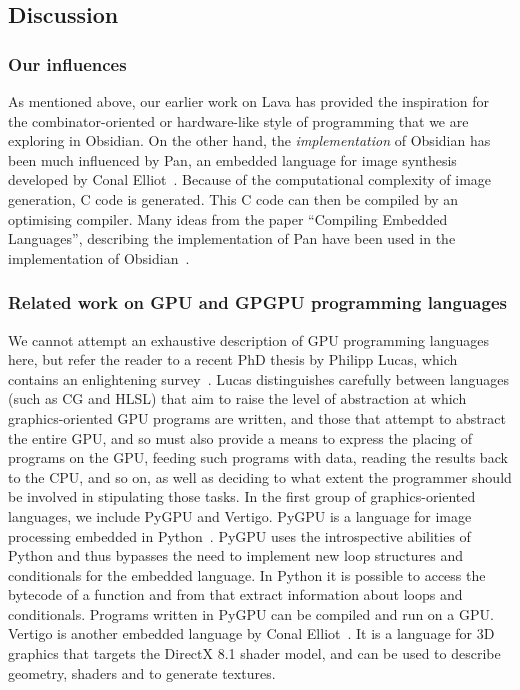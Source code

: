 
\subsection{Discussion} \label{sec:disc}
\subsubsection{Our influences}
As mentioned above, our earlier work on Lava has provided the inspiration for
the combinator-oriented or hardware-like style of programming that we are exploring in Obsidian.
On the other hand, the {\em implementation} of Obsidian has been much influenced by
{Pan}, an embedded language for image synthesis developed by 
Conal Elliot~. Because of the computational complexity of image generation, C 
code is generated. This C code can then be compiled by an optimising compiler. 
Many ideas from the paper 
``Compiling Embedded Languages'', describing the implementation of Pan have been 
used in the implementation of Obsidian~. 

\subsubsection{Related work on GPU and GPGPU programming languages}
We cannot attempt an exhaustive description of GPU programming languages here, but refer the reader to a recent PhD thesis by Philipp Lucas, which contains an enlightening survey~. Lucas distinguishes carefully between languages (such as CG and HLSL) that aim to raise the level of abstraction at which graphics-oriented GPU programs are written, and those that attempt to abstract the entire GPU, and so must also provide a means to express the placing of programs on the GPU, feeding such programs with data, reading the results back to the CPU, and so on, as well as deciding to what extent the programmer should be involved
in stipulating those tasks.
In the first group of graphics-oriented languages, we include PyGPU and Vertigo.
PyGPU is a language for image processing embedded in Python~. 
PyGPU uses the introspective abilities of Python and thus bypasses
the need to implement new loop structures and conditionals for the embedded 
language. In Python it is possible to access the bytecode of a function and 
from that extract information about loops and conditionals. 
Programs written in PyGPU can be compiled and run on a GPU. 
Vertigo is another embedded language by Conal Elliot~. It
is a language for 3D graphics that targets the DirectX 8.1 shader model, and
can be used to describe geometry, shaders and to generate textures. 

